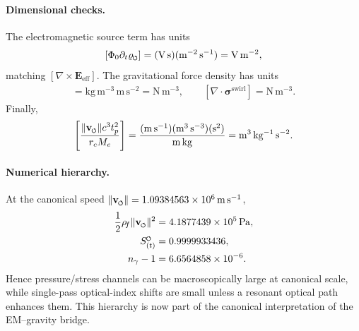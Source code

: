 \documentclass[11pt]{article}
\theoremstyle{definition}
\theoremstyle{plain}
\theoremstyle{remark}
\newcommand{\swirlarrow}{\mathchoice{\mkern-2mu\scriptstyle\boldsymbol{\circlearrowleft}}{\mkern-2mu\scriptstyle\boldsymbol{\circlearrowleft}}{\mkern-2mu\scriptscriptstyle\boldsymbol{\circlearrowleft}}{\mkern-2mu\scriptscriptstyle\boldsymbol{\circlearrowleft}}}
\newcommand{\vswirl}{\mathbf{v}_{\swirlarrow}}
\newcommand{\rhoF}{{\rho_{\!f}}}
\newcommand{\rhoM}{\rho_{\!m}}
\newcommand{\SwirlClock}{{S_{(t)}^{\swirlarrow}}}
\newcommand{\rc}{{r_c}}
\begin{document}
        \paragraph{Dimensional checks.}
        The electromagnetic source term has units
        \begin{align}
            \left[\Phi_0\partial_t\varrho_{\swirlarrow}\right]
            =
            (\mathrm{V\,s})(\mathrm{m^{-2}\,s^{-1}})
            =
            \mathrm{V\,m^{-2}},
        \end{align}
        matching \([\nabla\times\mathbf{E}_{\mathrm{eff}}]\). The gravitational force density has units
        \begin{align}
            [\rhoM\mathbf{g}_{\swirlarrow}]
            =
            \mathrm{kg\,m^{-3}}\,\mathrm{m\,s^{-2}}
            =
            \mathrm{N\,m^{-3}},
            \qquad
            [\nabla\cdot\boldsymbol{\sigma}^{\mathrm{swirl}}]
            =
            \mathrm{N\,m^{-3}}.
        \end{align}
        Finally,
        \begin{align}
            \left[
            \frac{\lVert\vswirl\rVert c^3 t_p^2}{\rc M_e}
            \right]
            =
            \frac{(\mathrm{m\,s^{-1}})(\mathrm{m^3\,s^{-3}})(\mathrm{s^2})}
            {\mathrm{m}\,\mathrm{kg}}
            =
            \mathrm{m^3\,kg^{-1}\,s^{-2}}.
        \end{align}

        \paragraph{Numerical hierarchy.}
        At the canonical speed \(\lVert\vswirl\rVert=1.09384563\times10^6\,\mathrm{m\,s^{-1}}\),
        \begin{align}
            \frac{1}{2}\rhoF\lVert\vswirl\rVert^2
            &=
            4.1877439\times10^5\,\mathrm{Pa},
            \\
            \SwirlClock
            &=
            0.9999933436,
            \\
            n_\gamma-1
            &=
            6.6564858\times10^{-6}.
            \label{eq:canonical_emg_numerical_hierarchy}
        \end{align}
        Hence pressure/stress channels can be macroscopically large at canonical scale, while single-pass optical-index shifts are small unless a resonant optical path enhances them. This hierarchy is now part of the canonical interpretation of the EM--gravity bridge.
\end{document}
